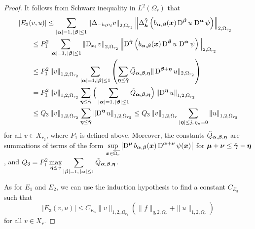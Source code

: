 \begin{proof}
It follows from Schwarz inequality in $L^2(\Omega_r)$ that
\begin{align*}
&\left| E_3(v,u) \right| \leq \sum_{|{\bm{\alpha}}|= 1,\,|{\bm{\beta}}|\leq 1}
\left\| \Delta_{-h_i {\bm{e}}_i} v \right\|_{2,\Omega_{r_2}}
\left\| \Delta_{{\bm{h}}}^{\tilde{{\bm{\gamma}}}} \left(
b_{{\bm{\alpha}},{\bm{\beta}}}({\bm{x}}) \operatorname{D}^{{\bm{\beta}}} u
\, \operatorname{D}^{{\bm{\alpha}}} \psi \right) \right\|_{2,\Omega_{r_2}} \\
&\qquad \leq P_1^2 \sum_{|{\bm{\alpha}}|= 1,\,|{\bm{\beta}}|\leq 1}
\left\| \operatorname{D}_{x_i} v \right\|_{2,\Omega_{r_2}}
\left\| \operatorname{D}^{\tilde{{\bm{\gamma}}}} \left(
b_{{\bm{\alpha}},{\bm{\beta}}}({\bm{x}}) \operatorname{D}^{{\bm{\beta}}} u \,
\operatorname{D}^{{\bm{\alpha}}} \psi \right) \right\|_{2,\Omega_{r_2}} \\
&\qquad \leq P_1^2
\left\| v \right\|_{1,2,\Omega_{r_2}}
\sum_{|{\bm{\alpha}}|= 1 ,|{\bm{\beta}}|\leq 1} \left(
\sum_{{\bm{\eta}} \leq \tilde{{\bm{\gamma}}}}
\tilde{Q}_{{\bm{\alpha}},{\bm{\beta}},{\bm{\eta}} }
\| \operatorname{D}^{{\bm{\beta}}+{\bm{\eta}}} u \|_{2,\Omega_{r_2}} \right) \\
&\qquad = P_1^2 \left\|v\right\|_{1,2,\Omega_{r_2}}
\sum_{{\bm{\eta}} \leq \tilde{{\bm{\gamma}}}} \Big(
\sum_{|{\bm{\alpha}}|=1,\,|{\bm{\beta}}|\leq 1}
\tilde{Q}_{{\bm{\alpha}},{\bm{\beta}},{\bm{\eta}}} \Big)
\left\| \operatorname{D}^{{\bm{\eta}}} u \right\|_{1,2,\Omega_{r_2}} \\
&\qquad \leq Q_3 \left\| v \right\|_{1,2,\Omega_{r_2}}
\sum_{{\bm{\eta}} \leq \tilde{{\bm{\gamma}}}} \left\|
\operatorname{D}^{{\bm{\eta}}} u \right\|_{1,2,\Omega_{r_2}}
\leq Q_3 \left\| v \right\|_{1,2,\Omega_r}
\sum_{|{\bm{\eta}}| \leq j,\, \eta_n=0} \left\| u \right\|_{1,2,\Omega_{r_2}}
\end{align*}
for all $v \in X_{r_2}$, where $P_1$ is defined above.  Moreover,
the constants $\tilde{Q}_{{\bm{\alpha}},{\bm{\beta}},{\bm{\eta}}}$ are
summations of terms of the form
$\displaystyle \sup_{{\bm{x}} \in \overline{\Omega_r}} \left|\operatorname{D}^{{\bm{\mu}}}
b_{{\bm{\alpha}},{\bm{\beta}}}({\bm{x}})\operatorname{D}^{{\bm{\alpha}}+{\bm{\nu}}}
\psi({\bm{x}}) \right|$
for ${\bm{\mu}}+{\bm{\nu}} \leq \tilde{{\bm{\gamma}}} - {\bm{\eta}}$, and
$\displaystyle Q_3 = P_1^2 \max_{{\bm{\eta}} \leq \tilde{{\bm{\gamma}}}}
\sum_{|{\bm{\beta}}|=1,\,|{\bm{\alpha}}|\leq 1}
\tilde{Q}_{{\bm{\alpha}},{\bm{\beta}},{\bm{\eta}}}$.

As for $E_1$ and $E_2$, we can use the induction
hypothesis to find a constant $C_{E_3}$ such that
\[
\left| E_3(v,u) \right| \leq C_{E_3} \|v\|_{1,2,\Omega_{r_2}}
\left( \|f\|_{q,2,\Omega_r} + \|u\|_{1,2,\Omega_r} \right)
\]
for all $v \in X_r$.


\end{proof}
